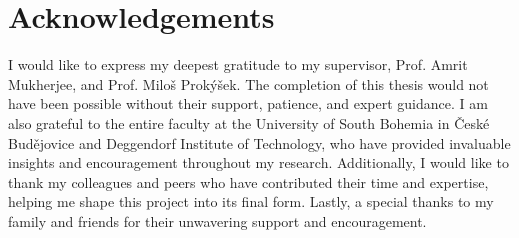 \chapter*{Acknowledgements}

I would like to express my deepest gratitude to my supervisor, Prof. Amrit Mukherjee, and Prof. Miloš Prokýšek. The completion of this thesis would not have been possible without their support, patience, and expert guidance. I am also grateful to the entire faculty at the University of South Bohemia in České Budějovice and Deggendorf Institute of Technology, who have provided invaluable insights and encouragement throughout my research. Additionally, I would like to thank my colleagues and peers who have contributed their time and expertise, helping me shape this project into its final form. Lastly, a special thanks to my family and friends for their unwavering support and encouragement.
